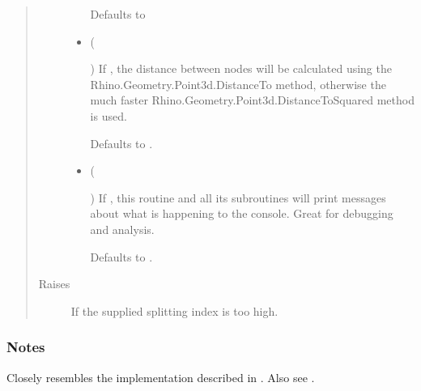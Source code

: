 \documentclass[letterpaper,10pt,english]{sphinxmanual}
\begin{document}
\begin{fulllineitems}
\begin{fulllineitems}
\begin{quote}
\begin{description}
\begin{itemize}
Defaults to 


\item {} 
 (%
\begin{footnote}[137]\sphinxAtStartFootnote
{}
%
\end{footnote}\sphinxstyleliteralemphasis{\sphinxupquote{, }}) \textendash{} 
If , the distance between nodes will be calculated using
the Rhino.Geometry.Point3d.DistanceTo method, otherwise the much
faster Rhino.Geometry.Point3d.DistanceToSquared method is used.

Defaults to .


\item {} 
 (%
\begin{footnote}[138]\sphinxAtStartFootnote
{}
%
\end{footnote}\sphinxstyleliteralemphasis{\sphinxupquote{, }}) \textendash{} 
If , this routine and all its subroutines will print
messages about what is happening to the console. Great for
debugging and analysis.

Defaults to .


\end{itemize}

\item[{Raises}] \leavevmode
{\hyperref[\detokenize{cockatoo:cockatoo.exception.KnitNetworkError}]{}} \textendash{} If the supplied splitting index is too high.

\end{description}\end{quote}
\subsubsection*{Notes}

Closely resembles the implementation described in  \sphinxfootnotemark[1]. Also see
 \sphinxfootnotemark[2].


\end{fulllineitems}
\end{fulllineitems}
\end{document}
